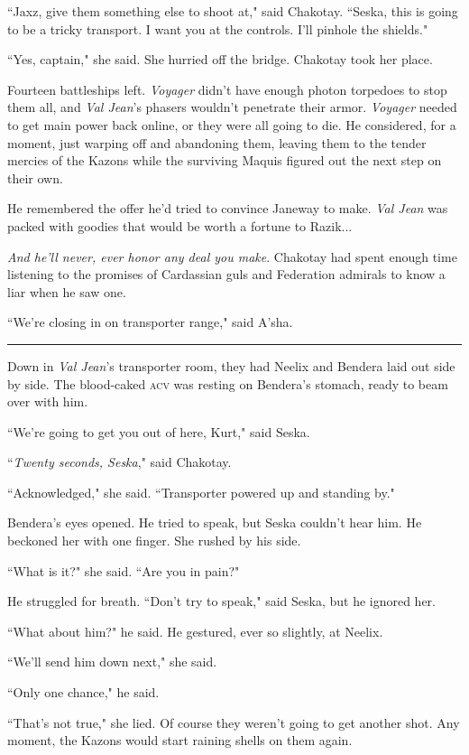 \documentclass[twoside,letterpaper,12pt]{memoir}
\begin{document}
``Jaxz, give them something else to shoot at," said Chakotay. ``Seska, this is going to be a tricky transport. I want you at the controls. I'll pinhole the shields."

``Yes, captain," she said. She hurried off the bridge. Chakotay took her place.

Fourteen battleships left. \textit{Voyager} didn't have enough photon torpedoes to stop them all, and \textit{Val Jean}'s phasers wouldn't penetrate their armor. \textit{Voyager} needed to get main power back online, or they were all going to die. He considered, for a moment, just warping off and abandoning them, leaving them to the tender mercies of the Kazons while the surviving Maquis figured out the next step on their own.

He remembered the offer he'd tried to convince Janeway to make. \textit{Val Jean} was packed with goodies that would be worth a fortune to Razik...

\textit{And he'll never, ever honor any deal you make}. Chakotay had spent enough time listening to the promises of Cardassian guls and Federation admirals to know a liar when he saw one.

``We're closing in on transporter range," said A'sha.

\fancybreak{\rule{3cm}{0.4 pt}}
Down in \textit{Val Jean}'s transporter room, they had Neelix and Bendera laid out side by side. The blood-caked \textsc{acv} was resting on Bendera's stomach, ready to beam over with him.

``We're going to get you out of here, Kurt," said Seska.

``\textit{Twenty seconds, Seska}," said Chakotay.

``Acknowledged," she said. ``Transporter powered up and standing by."

Bendera's eyes opened. He tried to speak, but Seska couldn't hear him. He beckoned her with one finger. She rushed by his side.

``What is it?" she said. ``Are you in pain?"

He struggled for breath. ``Don't try to speak," said Seska, but he ignored her.

``What about him?" he said. He gestured, ever so slightly, at Neelix.

``We'll send him down next," she said.

``Only one chance," he said.

``That's not true," she lied. Of course they weren't going to get another shot. Any moment, the Kazons would start raining shells on them again.
\end{document}
